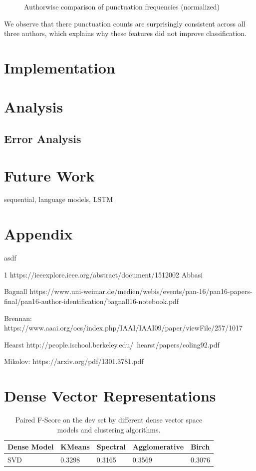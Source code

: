 \documentclass[12pt]{article}
\begin{document}
\begin{figure}[h]
   
  \caption{Authorwise comparison of punctuation frequencies (normalized)}
  \label{fig:punc}

\end{figure}

We observe that there punctuation counts are surprisingly consistent across all three authors, which explains why these features did not improve classification.


\section{Implementation}

\section{Analysis}
\subsection{Error Analysis}

\section{Future Work}
sequential, language models, LSTM

\section{Appendix}

asdf

1 https://ieeexplore.ieee.org/abstract/document/1512002 Abbasi

Bagnall https://www.uni-weimar.de/medien/webis/events/pan-16/pan16-papers-final/pan16-author-identification/bagnall16-notebook.pdf

Brennan: https://www.aaai.org/ocs/index.php/IAAI/IAAI09/paper/viewFile/257/1017

Hearst http://people.ischool.berkeley.edu/~hearst/papers/coling92.pdf

Mikolov: https://arxiv.org/pdf/1301.3781.pdf



\section{Dense Vector Representations}



\begin{table}[!h]
\centering
\begin{tabular}{l|l|l|l|l}
Dense Model	& KMeans	& Spectral		& Agglomerative	& Birch \\
\hline
SVD			& 0.3298	& 0.3165		& 0.3569			& 0.3076 \\
\end{tabular}
\caption{Paired F-Score on the dev set by different dense vector space models and clustering algorithms.}
\label{tab:denseresults}
\end{table}
\end{document}
